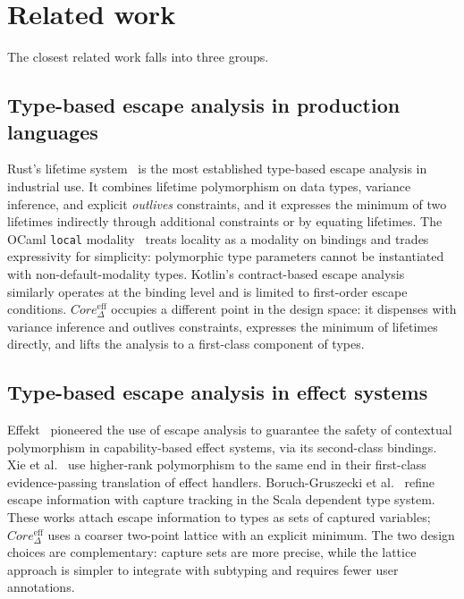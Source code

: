 \documentclass[12pt,a4paper]{article}
\begin{document}
    \section{Related work} \label{sec:related-work}

    The closest related work falls into three groups.

    \subsection{Type-based escape analysis in production languages}

    Rust's lifetime system~\cite{matsakis2014rust} is the most established
    type-based escape analysis in industrial use.
    It combines lifetime polymorphism on data types, variance inference, and
    explicit \emph{outlives} constraints, and it expresses the minimum of two
    lifetimes indirectly through additional constraints or by equating lifetimes.
    The OCaml \texttt{local} modality~\cite{lorenzen2024oxidizing} treats locality
    as a modality on bindings and trades expressivity for simplicity:
    polymorphic type parameters cannot be instantiated with non-default-modality
    types.
    Kotlin's contract-based escape analysis~\cite{akhin2021kotlin} similarly
    operates at the binding level and is limited to first-order escape
    conditions.
    $Core_\Delta^{\mathrm{eff}}$ occupies a different point in the design space:
    it dispenses with variance inference and outlives constraints, expresses the
    minimum of lifetimes directly, and lifts the analysis to a first-class
    component of types.

    \subsection{Type-based escape analysis in effect systems}

    Effekt~\cite{brachthauser2020effects, brachthauser2022effects} pioneered the
    use of escape analysis to guarantee the safety of contextual polymorphism in
    capability-based effect systems, via its second-class bindings.
    Xie et al.~\cite{xie2022first} use higher-rank polymorphism to the same end
    in their first-class evidence-passing translation of effect handlers.
    Boruch-Gruszecki et al.~\cite{boruch2023capturing} refine escape information
    with capture tracking in the Scala dependent type system.
    These works attach escape information to types as sets of captured variables;
    $Core_\Delta^{\mathrm{eff}}$ uses a coarser two-point lattice with an explicit
    minimum.
    The two design choices are complementary: capture sets are more precise,
    while the lattice approach is simpler to integrate with subtyping and
    requires fewer user annotations.
\end{document}
